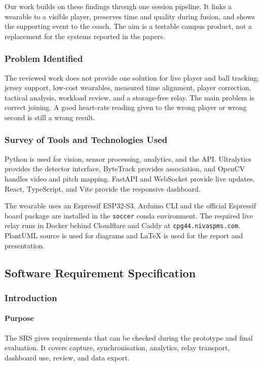 Our work builds on these findings through one session pipeline. It links a
wearable to a visible player, preserves time and quality during fusion, and
shows the supporting event to the coach. The aim is a testable campus product,
not a replacement for the systems reported in the papers.

\subsubsection{Problem Identified}
The reviewed work does not provide one solution for live player and ball
tracking, jersey support, low-cost wearables, measured time alignment, player
correction, tactical analysis, workload review, and a storage-free relay. The
main problem is correct joining. A good heart-rate reading given to the wrong
player or wrong second is still a wrong result.

\subsubsection{Survey of Tools and Technologies Used}
Python is used for vision, sensor processing, analytics, and the API.
Ultralytics provides the detector interface, ByteTrack provides association,
and OpenCV handles video and pitch mapping. FastAPI and WebSocket provide live
updates. React, TypeScript, and Vite provide the responsive dashboard.

The wearable uses an Espressif ESP32-S3. Arduino CLI and the official
Espressif board package are installed in the \texttt{soccer} conda environment.
The required live relay runs in Docker behind Cloudflare and Caddy at
\texttt{cpg44.nivaspms.com}. PlantUML source is used for diagrams and LaTeX is
used for the report and presentation.

\subsection{Software Requirement Specification}

\subsubsection{Introduction}

\paragraph{Purpose}
The SRS gives requirements that can be checked during the prototype and final
evaluation. It covers capture, synchronisation, analytics, relay transport,
dashboard use, review, and data export.

